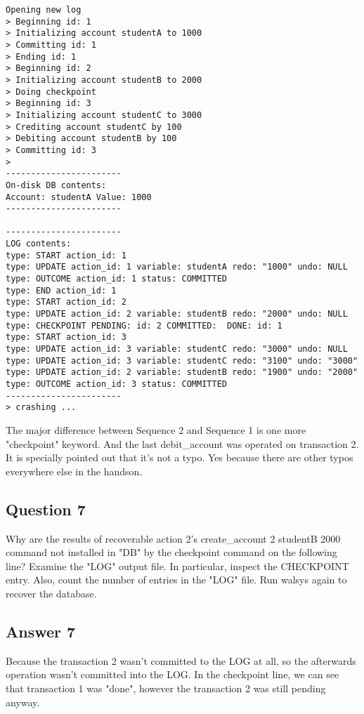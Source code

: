 \documentclass[12pt]{article}
\begin{document}
\begin{lstlisting}[numberstyle=\tiny\monaco,
        basicstyle=\small\monaco]
Opening new log
> Beginning id: 1
> Initializing account studentA to 1000
> Committing id: 1
> Ending id: 1
> Beginning id: 2
> Initializing account studentB to 2000
> Doing checkpoint
> Beginning id: 3
> Initializing account studentC to 3000
> Crediting account studentC by 100
> Debiting account studentB by 100
> Committing id: 3
> 
-----------------------
On-disk DB contents:
Account: studentA Value: 1000
-----------------------

-----------------------
LOG contents:
type: START action_id: 1
type: UPDATE action_id: 1 variable: studentA redo: "1000" undo: NULL
type: OUTCOME action_id: 1 status: COMMITTED
type: END action_id: 1
type: START action_id: 2
type: UPDATE action_id: 2 variable: studentB redo: "2000" undo: NULL
type: CHECKPOINT PENDING: id: 2 COMMITTED:  DONE: id: 1 
type: START action_id: 3
type: UPDATE action_id: 3 variable: studentC redo: "3000" undo: NULL
type: UPDATE action_id: 3 variable: studentC redo: "3100" undo: "3000"
type: UPDATE action_id: 2 variable: studentB redo: "1900" undo: "2000"
type: OUTCOME action_id: 3 status: COMMITTED
-----------------------
> crashing ...
\end{lstlisting}

The major difference between Sequence 2 and Sequence 1 is one more "checkpoint" keyword. And the last debit\_account was operated on transaction 2. It is specially pointed out that it's not a typo. Yes because there are other typos everywhere else in the handson.

\subsection*{Question 7} Why are the results of recoverable action 2's create\_account 2 studentB 2000 command not installed in "DB" by the checkpoint command on the following line? Examine the "LOG" output file. In particular, inspect the CHECKPOINT entry. Also, count the number of entries in the "LOG" file. Run wal\-sys again to recover the database.

\subsection*{Answer 7} Because the transaction 2 wasn't committed to the LOG at all, so the afterwards operation wasn't committed into the LOG. In the checkpoint line, we can see that transaction 1 was "done", however the transaction 2 was still pending anyway.
\end{document}
